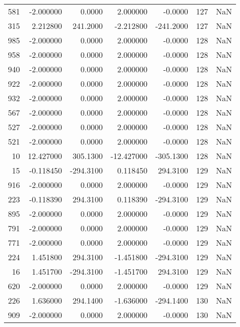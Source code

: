 \begin{tabular}{rrrrrrr}
 581 &   -2.000000 &    0.0000 &    2.000000 &     -0.0000 &         127 & NaN \\
 315 &    2.212800 &  241.2000 &   -2.212800 &   -241.2000 &         127 & NaN \\
 985 &   -2.000000 &    0.0000 &    2.000000 &     -0.0000 &         128 & NaN \\
 958 &   -2.000000 &    0.0000 &    2.000000 &     -0.0000 &         128 & NaN \\
 940 &   -2.000000 &    0.0000 &    2.000000 &     -0.0000 &         128 & NaN \\
 922 &   -2.000000 &    0.0000 &    2.000000 &     -0.0000 &         128 & NaN \\
 932 &   -2.000000 &    0.0000 &    2.000000 &     -0.0000 &         128 & NaN \\
 567 &   -2.000000 &    0.0000 &    2.000000 &     -0.0000 &         128 & NaN \\
 527 &   -2.000000 &    0.0000 &    2.000000 &     -0.0000 &         128 & NaN \\
 521 &   -2.000000 &    0.0000 &    2.000000 &     -0.0000 &         128 & NaN \\
  10 &   12.427000 &  305.1300 &  -12.427000 &   -305.1300 &         128 & NaN \\
  15 &   -0.118450 & -294.3100 &    0.118450 &    294.3100 &         129 & NaN \\
 916 &   -2.000000 &    0.0000 &    2.000000 &     -0.0000 &         129 & NaN \\
 223 &   -0.118390 &  294.3100 &    0.118390 &   -294.3100 &         129 & NaN \\
 895 &   -2.000000 &    0.0000 &    2.000000 &     -0.0000 &         129 & NaN \\
 791 &   -2.000000 &    0.0000 &    2.000000 &     -0.0000 &         129 & NaN \\
 771 &   -2.000000 &    0.0000 &    2.000000 &     -0.0000 &         129 & NaN \\
 224 &    1.451800 &  294.3100 &   -1.451800 &   -294.3100 &         129 & NaN \\
  16 &    1.451700 & -294.3100 &   -1.451700 &    294.3100 &         129 & NaN \\
 620 &   -2.000000 &    0.0000 &    2.000000 &     -0.0000 &         129 & NaN \\
 226 &    1.636000 &  294.1400 &   -1.636000 &   -294.1400 &         130 & NaN \\
 909 &   -2.000000 &    0.0000 &    2.000000 &     -0.0000 &         130 & NaN \\

\end{tabular}
